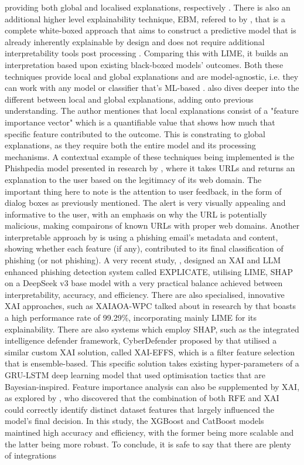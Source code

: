 providing both global and localised explanations, respectively \citep{palaniappan2020malicious}. There is also an additional higher level explainability technique, EBM, refered to by \cite{hernandes2021phishing}, that is a complete white-boxed approach that aims to construct a predictive model that is already inherently explainable by design and does not require additional interpretability tools post processing \citep{greco2023explaining}. Comparing this with LIME, it builds an interpretation based upon existing black-boxed models' outcomes. Both these techniques provide local and global explanations and are model-agnostic, i.e. they can work with any model or classifier that's ML-based \citep{anderson2015polymorphic}. \cite{greco2023explaining} also dives deeper into the different between local and global explanations, adding onto previous understanding. The author mentiones that local explanations consist of a "feature importance vector" which is a quantifiable value that shows how much that specific feature contributed to the outcome. This is constrating to global explanations, as they require both the entire model and its processing mechanisms. A contextual example of these techniques being implemented is the Phishpedia model presented in research by \cite{lin2021phishpedia}, where it takes URLs and returns an explanation to the user based on the legitimacy of its web domain. The important thing here to note is the attention to user feedback, in the form of dialog boxes as previously mentioned. The alert is very visually appealing and informative to the user, with an emphasis on why the URL is potentially malicious, making compairons of known URLs with proper web domains. Another interpretable approach by \cite{bravo2010bridging} is using a phishing email's metadata and content, showing whether each feature (if any), contributed to its final classification of phishing (or not phishing). A very recent study, \cite{lim2025explicate}, designed an XAI and LLM enhanced phishing detection system called EXPLICATE, utilising LIME, SHAP on a DeepSeek v3 base model with a very practical balance achieved between interpretability, accuracy, and efficiency. There are also specialised, innovative XAI approaches, such as XAIAOA-WPC talked about in research by \cite{alotaibi2025explainable} that boasts a high performance rate of 99.29\%, incorporating mainly LIME for its explainability. There are also systems which employ SHAP, such as the integrated intelligence defender framework, CyberDefender proposed by \cite{krishnaveni2024cyberdefender} that utilised a similar custom XAI solution, called XAI-EFFS, which is a filter feature selection that is ensemble-based. This specific solution takes existing hyper-parameters of a GRU-LSTM deep learning model that used optimisation tactics that are Bayesian-inspired. Feature importance analysis can also be supplemented by XAI, as explored by \cite{fajar2024enhancing}, who discovered that the combination of both RFE and XAI could correctly identify distinct dataset features that largely influenced the model's final decision. In this study, the XGBoost and CatBoost models maintined high accuracy and efficiency, with the former being more scalable and the latter being more robust. To conclude, it is safe to say that there are plenty of integrations 